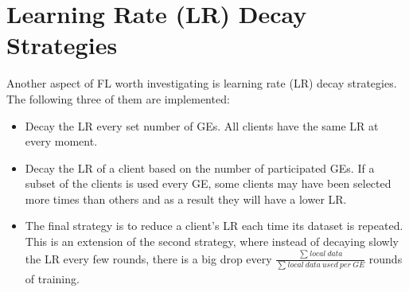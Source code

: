 \section{Learning Rate (LR) Decay Strategies}
Another aspect of FL worth investigating is learning rate (LR) decay strategies. The following three of them are implemented:
\begin{itemize}
    \item Decay the LR every set number of GEs. All clients have the same LR at every moment.
    \item Decay the LR of a client based on the number of participated GEs. If a subset of the clients is used every GE, some clients may have been selected more times than others and as a result they will have a lower LR.
    \item The final strategy is to reduce a client's LR each time its dataset is repeated. This is an extension of the second strategy, where instead of decaying slowly the LR every few rounds, there is a big drop every \( \displaystyle \frac{\sum_{}^{}local\ data}{\sum_{}^{} local\ data\ used\ per\ GE} \) rounds of training.
\end{itemize}
\begin{table}[H]
    \center
    \caption[Experiment 7 parameters]{Experiment 7 parameters}
    \label{table:Experiment 7 parameters}
\end{table}
